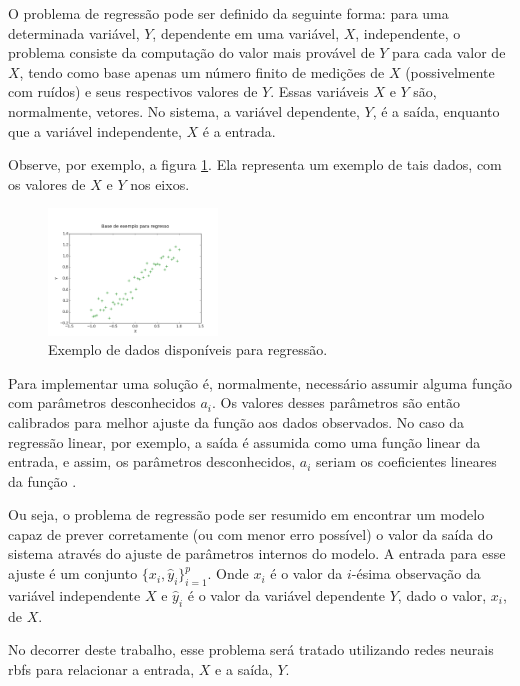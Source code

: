 \documentclass[conference]{IEEEtran}
\begin{document}
O problema de regressão \cite{specht1991general} pode ser definido da seguinte 
forma: para uma determinada variável, $Y$, dependente em uma variável, $X$, 
independente, o problema consiste da computação do valor mais provável de $Y$ 
para cada valor de $X$, tendo como base apenas um número finito de medições de 
$X$ (possivelmente com ruídos) e seus respectivos valores de $Y$. Essas 
variáveis $X$ e $Y$ são, normalmente, vetores. No sistema, a variável 
dependente, $Y$, é a saída, enquanto que a variável independente, $X$ é a 
entrada.

Observe, por exemplo, a figura \ref{fig:regressao}. Ela representa um 
exemplo de tais dados, com os valores de $X$ e $Y$ nos eixos.

\begin{figure}[t]
	\caption{Exemplo de dados disponíveis para regressão.}
	\label{fig:regressao}
	\centering
	\includegraphics[width=0.40\textwidth]{regression_data_example}
\end{figure}

Para implementar uma solução é, normalmente, necessário assumir alguma função 
com parâmetros desconhecidos $a_{i}$. Os valores desses parâmetros são então 
calibrados para melhor ajuste da função aos dados observados. No caso da 
regressão linear, por exemplo, a saída é assumida como uma função linear da 
entrada, e assim, os parâmetros desconhecidos, $a_{i}$ seriam os coeficientes 
lineares da função \cite{specht1991general}.

Ou seja, o problema de regressão pode ser resumido em encontrar um modelo capaz 
de prever corretamente (ou com menor erro possível) o valor da saída do sistema
através do ajuste de parâmetros internos do modelo. A entrada para esse ajuste é 
um conjunto $\{x_{i}, \hat{y}_{i}\}_{i=1}^{p}$. Onde $x_{i}$ é o valor da 
$i$-ésima observação da variável independente $X$ e $\hat{y}_{i}$ é o valor da 
variável dependente $Y$, dado o valor, $x_{i}$, de $X$.

No decorrer deste trabalho, esse problema será tratado utilizando redes neurais 
\acp*{rbf} para relacionar a entrada, $X$ e a saída, $Y$.
\end{document}
